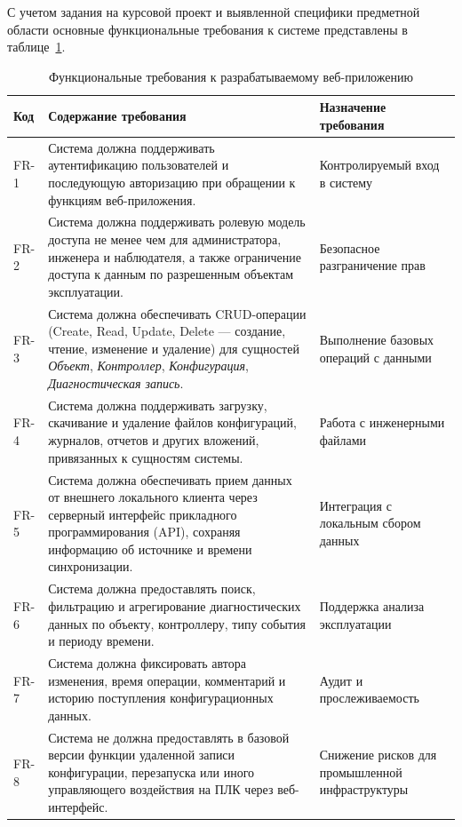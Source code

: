 С учетом задания на курсовой проект и выявленной специфики предметной области
основные функциональные требования к системе представлены в таблице~\ref{tab:functional_requirements}.
\clearpage

\begin{table}[ht!]
    \centering
    \small
    \caption{Функциональные требования к разрабатываемому веб-приложению}
    \label{tab:functional_requirements}
    \begin{tabular}{|p{}|p{}|p{}|}
        \hline
        \textbf{Код} & \textbf{Содержание требования} & \textbf{Назначение требования} \\ \hline
        FR-1 & Система должна поддерживать аутентификацию пользователей и последующую авторизацию при обращении к функциям веб-приложения. & Контролируемый вход в систему \\ \hline
        FR-2 & Система должна поддерживать ролевую модель доступа не менее чем для администратора, инженера и наблюдателя, а также ограничение доступа к данным по разрешенным объектам эксплуатации. & Безопасное разграничение прав \\ \hline
        FR-3 & Система должна обеспечивать CRUD-операции (Create, Read, Update, Delete --- создание, чтение, изменение и удаление) для сущностей \textit{Объект}, \textit{Контроллер}, \textit{Конфигурация}, \textit{Диагностическая запись}. & Выполнение базовых операций с данными \\ \hline
        FR-4 & Система должна поддерживать загрузку, скачивание и удаление файлов конфигураций, журналов, отчетов и других вложений, привязанных к сущностям системы. & Работа с инженерными файлами \\ \hline
        FR-5 & Система должна обеспечивать прием данных от внешнего локального клиента через серверный интерфейс прикладного программирования (API), сохраняя информацию об источнике и времени синхронизации. & Интеграция с локальным сбором данных \\ \hline
        FR-6 & Система должна предоставлять поиск, фильтрацию и агрегирование диагностических данных по объекту, контроллеру, типу события и периоду времени. & Поддержка анализа эксплуатации \\ \hline
        FR-7 & Система должна фиксировать автора изменения, время операции, комментарий и историю поступления конфигурационных данных. & Аудит и прослеживаемость \\ \hline
        FR-8 & Система не должна предоставлять в базовой версии функции удаленной записи конфигурации, перезапуска или иного управляющего воздействия на ПЛК через веб-интерфейс. & Снижение рисков для промышленной инфраструктуры \\ \hline
    \end{tabular}
    \normalsize
\end{table}


